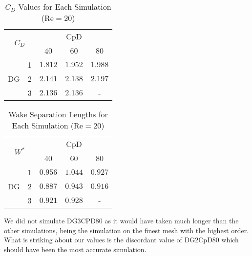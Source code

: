 \begin{table}[htp]
	\centering
	\def\arraystretch{1.5}
			\begin{tabular}{|c|c|c|c|c|}
				\hline
				\multicolumn{2}{|c|}{\multirow{2}{*}{$C_D$}} & \multicolumn{3}{c|}{CpD} \\ \cline{3-5} 
				\multicolumn{2}{|c|}{}                       & 40     & 60    & 80    \\ \hline
				\multirow{3}{*}{DG}            & 1           &    $1.812$    &  $1.952$     &    $1.988$    \\ \cline{2-5} 
				& 2           &    $2.141$    &    $2.138$   &   $2.197$     \\ \cline{2-5} 
				& 3           &    $2.136$    &     $2.136$  &   -     \\ \hline
			\end{tabular}
			\caption[$C_D$ Values for Each Simulation]{$C_D$ Values for Each Simulation ($\text{Re} = 20$)}	
			\label{C_D20}
		\end{table}
			\begin{table}[htp]
		\centering
		\def\arraystretch{1.5}
		\begin{tabular}{|c|c|c|c|c|}
			\hline
			\multicolumn{2}{|c|}{\multirow{2}{*}{$W^*$}} & \multicolumn{3}{c|}{CpD} \\ \cline{3-5} 
			\multicolumn{2}{|c|}{}                       & 40     & 60    & 80    \\ \hline
			\multirow{3}{*}{DG}            & 1           &    $0.956$    &     $1.044$  &    $0.927$    \\ \cline{2-5} 
			& 2           &    $0.887$    &     $0.943$  &    $0.916$    \\ \cline{2-5} 
			& 3           &     $0.921$   &     $0.928$  &    -    \\ \hline
		\end{tabular}
		\caption{Wake Separation Lengths for Each Simulation ($\text{Re} = 20$)}	
		\label{W20}
\end{table}
We did not simulate DG3CPD80 as it would have taken much longer than the other simulations, being the simulation on the finest mesh with the highest order. What is striking about our values is the discordant value of DG2CpD80 which should have been the most accurate simulation. 

